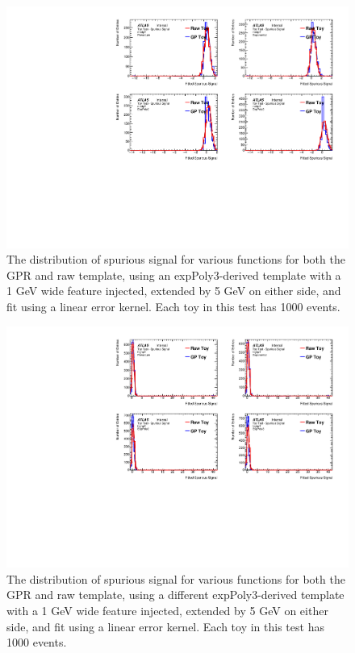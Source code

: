 \begin{figure} 
\begin{center}
  \includegraphics[width=\textwidth]{figures/background/gpr/validation/linear/ToyTest_FitSigVals_medpT_1000_Sig_1s}   
\caption{The distribution of spurious signal for various functions for both the GPR and raw template, using an expPoly3-derived template with a 1 GeV wide feature injected, extended by 5 GeV on either side, and fit using a linear error kernel. Each toy in this test has 1000 events.}
\label{fig:linearkernel_medpt_1000_Sig_1s}
\end{center}
\end{figure}

\begin{figure} 
\begin{center}
  \includegraphics[width=\textwidth]{figures/background/gpr/validation/linear/ToyTest_FitSigVals_highpT_1000_Sig_1s}   
\caption{The distribution of spurious signal for various functions for both the GPR and raw template, using a different expPoly3-derived template with a 1 GeV wide feature injected, extended by 5 GeV on either side, and fit using a linear error kernel. Each toy in this test has 1000 events.}
\label{fig:linearkernel_highpt_1000_Sig_1s}
\end{center}
\end{figure}

